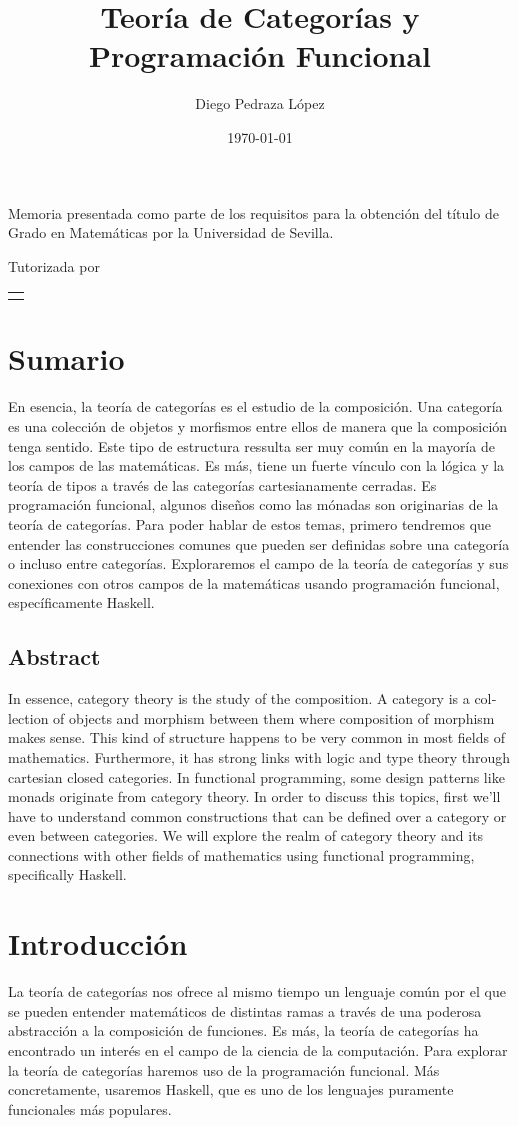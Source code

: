 \documentclass[12pt, twoside]{book}
\title{Teoría de Categorías y Programación Funcional}
\author{Diego Pedraza López}
\date{\today}
\makeatletter
\renewcommand\maketitle{%
  \begin{titlepage}
      \vspace*{1.5cm}
      \parskip=0pt
      \Huge\bfseries
      \begin{center}
          \@title
      \end{center}
      \vspace{1cm}
      \begin{center}
          \@author
      \end{center}
  \end{titlepage}

  \begin{titlepage}
  \parindent=0pt
  \begin{flushleft}
  \vspace*{1.5mm}
  \setlength\baselineskip{0pt}
  \setlength\parskip{0mm}
  \begin{center}
  \end{center}
  \end{flushleft}
  \vspace{1cm}
  \bgroup
  \Large \bfseries
  \begin{center}
  \@title
  \end{center}
  \egroup
  \vspace*{.5cm}
  \begin{center}
  \@author
  \end{center}
  \vspace*{1.8cm}
  \begin{flushright}
  \begin{minipage}{8.45cm}
      Memoria presentada como parte de los requisitos para la obtención del título de
      Grado en Matemáticas por la Universidad de Sevilla.

      \vspace*{7.5mm}

      Tutorizada por
  \end{minipage}\par
  \begin{tabularx}{8.45cm}[b]{@{}l}
      \guardatutores
  \end{tabularx}
   \end{flushright}
      \vspace*{\fill}
   \end{titlepage}
   \pagestyle{tfg}
   \renewcommand{\chaptermark}[1]{\markright{\thechapter.\space ##1}}
   \renewcommand{\sectionmark}[1]{}
   \renewcommand{\subsectionmark}[1]{}
  }
\makeatother
\begin{document}
\maketitle

\frontmatter
\tableofcontents

\mainmatter

\chapter*{Sumario}
En esencia, la teoría de categorías es el estudio de la composición.
Una categoría es una colección de objetos y morfismos entre ellos de manera que la composición tenga sentido.
Este tipo de estructura ressulta ser muy común en la mayoría de los campos de las matemáticas.
Es más, tiene un fuerte vínculo con la lógica y la teoría de tipos a través de las categorías cartesianamente cerradas.
Es programación funcional, algunos diseños como las mónadas son originarias de la teoría de categorías.
Para poder hablar de estos temas, primero tendremos que entender las construcciones comunes que pueden ser definidas sobre una categoría o incluso entre categorías.
Exploraremos el campo de la teoría de categorías y sus conexiones con otros campos de la matemáticas usando programación funcional, específicamente Haskell.

\section*{Abstract}
\begin{otherlanguage}{english}
    In essence, category theory is the study of the composition.
    A category is a collection of objects and morphism between them where composition of morphism makes sense.
    This kind of structure happens to be very common in most fields of mathematics.
    Furthermore, it has strong links with logic and type theory through cartesian closed categories.
    In functional programming, some design patterns like monads originate from category theory.
    In order to discuss this topics, first we'll have to understand common constructions that can be defined over a category or even between categories. 
    We will explore the realm of category theory and its connections with other fields of mathematics using functional programming, specifically Haskell.
\end{otherlanguage}

\chapter{Introducción}
La teoría de categorías nos ofrece al mismo tiempo un lenguaje común por el que se pueden entender matemáticos de distintas ramas a través de una poderosa abstracción a la composición de funciones.
Es más, la teoría de categorías ha encontrado un interés en el campo de la ciencia de la computación.
Para explorar la teoría de categorías haremos uso de la programación funcional.
Más concretamente, usaremos Haskell, que es uno de los lenguajes puramente funcionales más populares.
\end{document}

